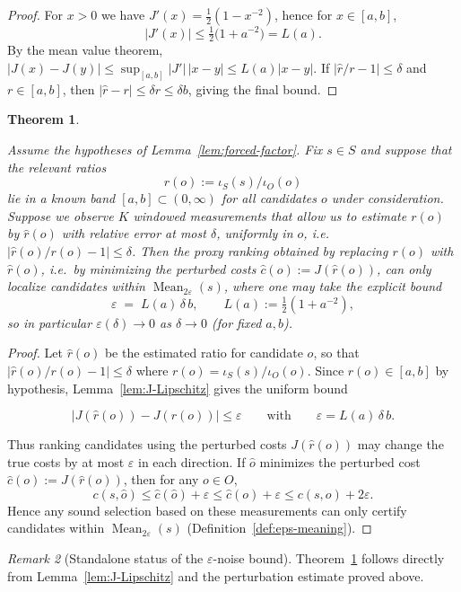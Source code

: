 \documentclass[11pt,reqno]{amsart}
\newtheorem{theorem}{Theorem}[section]
\theoremstyle{definition}
\theoremstyle{remark}
\newtheorem{remark}[theorem]{Remark} %
\newcommand{\1}{\mathbf{1}}
\newcommand{\Mean}{\operatorname{Mean}}
\newcommand{\eps}{\varepsilon}
\begin{document}
\begin{proof}
For $x>0$ we have $J'(x)=\tfrac12(1-x^{-2})$, hence for $x\in[a,b]$,
\[
|J'(x)|\le \tfrac12\bigl(1+a^{-2}\bigr)=L(a).
\]
By the mean value theorem, $|J(x)-J(y)|\le \sup_{[a,b]}|J'|\,|x-y|\le L(a)|x-y|$.
If $|\widehat r/r-1|\le\delta$ and $r\in[a,b]$, then $|\widehat r-r|\le \delta r\le \delta b$, giving the final bound.
\end{proof}
\begin{theorem}\label{thm:eps-cert}

Assume the hypotheses of Lemma~\ref{lem:forced-factor}. Fix $s\in S$ and suppose that the relevant ratios
\[
r(o):=\iota_S(s)/\iota_O(o)
\]
lie in a known band $[a,b]\subset(0,\infty)$ for all candidates $o$ under consideration. Suppose we observe $K$
windowed measurements that allow us to estimate $r(o)$ by $\widehat r(o)$ with relative error at most $\delta$,
uniformly in $o$, i.e.\ $|\widehat r(o)/r(o)-1|\le \delta$. Then the proxy ranking obtained by replacing $r(o)$ with $\widehat r(o)$, i.e.\ by minimizing the perturbed costs $\widehat c(o):=J(\widehat r(o))$, can only localize candidates within $\Mean_{2\eps}(s)$, where one may take the explicit bound
\[
\eps \;=\; L(a)\,\delta\, b,
\qquad L(a):=\tfrac12(1+a^{-2}),
\]
so in particular $\eps(\delta)\to 0$ as $\delta\to 0$ (for fixed $a,b$).

\end{theorem}

\begin{proof}
Let $\widehat r(o)$ be the estimated ratio for candidate $o$, so that $|\widehat r(o)/r(o)-1|\le \delta$ where
$r(o)=\iota_S(s)/\iota_O(o)$. Since $r(o)\in[a,b]$ by hypothesis, Lemma~\ref{lem:J-Lipschitz} gives the uniform bound

\[
|J(\widehat r(o))-J(r(o))|\le \eps
\qquad\text{with}\qquad
\eps=L(a)\,\delta\,b.
\]

Thus ranking candidates using the perturbed costs $J(\widehat r(o))$ may change the true costs by at most $\eps$ in each direction. If $\widehat o$ minimizes the perturbed cost $\widehat c(o):=J(\widehat r(o))$, then for any $o\in O$,
\[
c(s,\widehat o)\le \widehat c(\widehat o)+\eps\le \widehat c(o)+\eps\le c(s,o)+2\eps.
\]
Hence any sound selection based on these measurements can only certify candidates within $\Mean_{2\eps}(s)$ (Definition~\ref{def:eps-meaning}).
\end{proof}


\begin{remark}[Standalone status of the $\eps$-noise bound]
Theorem~\ref{thm:eps-cert} follows directly from
Lemma~\ref{lem:J-Lipschitz} and the perturbation estimate proved above.
\end{remark}
\end{document}
